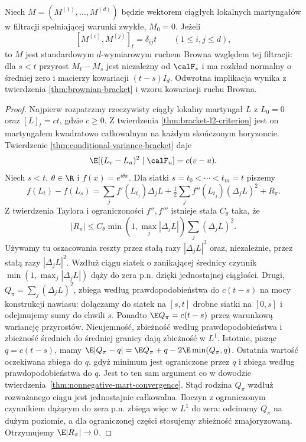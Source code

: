 \begin{twierdzenie}
\label{thm:levy-brownian-characterization}
Niech $M=(M^{(1)},\ldots,M^{(d)})$ będzie
wektorem ciągłych lokalnych martyngałów
w filtracji spełniającej warunki zwykłe,
$M_0=0$. Jeżeli
\[
[M^{(i)},M^{(j)}]_t=\delta_{ij}t
\qquad (1\le i,j\le d),
\]
to $M$ jest standardowym $d$-wymiarowym ruchem
Browna względem tej filtracji: dla $s<t$
przyrost $M_t-M_s$ jest niezależny od $\calF_s$
i ma rozkład normalny o średniej zero
i macierzy kowariacji $(t-s)I_d$.
Odwrotna implikacja wynika z twierdzenia
\ref{thm:brownian-bracket} i wzoru kowariacji
ruchu Browna.
\end{twierdzenie}
\begin{proof}
Najpierw rozpatrzmy rzeczywisty ciągły lokalny
martyngał $L$ z $L_0=0$ oraz $[L]_t=ct$,
gdzie $c\ge0$. Z twierdzenia
\ref{thm:bracket-l2-criterion} jest on martyngałem
kwadratowo całkowalnym na każdym skończonym
horyzoncie. Twierdzenie
\ref{thm:conditional-variance-bracket} daje
\[
\E[(L_v-L_u)^2\mid\calF_u]=c(v-u).
\]
Niech $s<t$, $\theta\in\R$ i
$f(x)=e^{i\theta x}$. Dla siatki
$s=t_0<\cdots<t_m=t$ piszemy
\[
f(L_t)-f(L_s)=
\sum_j f'(L_{t_j})\Delta_j L
+\tfrac12\sum_j f''(L_{t_j})(\Delta_j L)^2
+R_\pi .
\]
Z twierdzenia Taylora i ograniczoności
$f'',f'''$ istnieje stała $C_\theta$ taka, że
\[
|R_\pi|\le C_\theta
\min(1,\max_j|\Delta_j L|)
\sum_j(\Delta_j L)^2.
\]
Używamy tu oszacowania reszty przez stałą
razy $|\Delta_j L|^3$ oraz, niezależnie,
przez stałą razy $|\Delta_j L|^2$.
Wzdłuż ciągu siatek o zanikającej średnicy
czynnik $\min(1,\max_j|\Delta_jL|)$ dąży
do zera p.n. dzięki jednostajnej ciągłości.
Drugi, $Q_\pi=\sum_j(\Delta_j L)^2$,
zbiega według prawdopodobieństwa do $c(t-s)$
na mocy konstrukcji nawiasu: dołączamy do siatek
na $[s,t]$ drobne siatki na $[0,s]$
i odejmujemy sumy do chwili $s$.
Ponadto $\E Q_\pi=c(t-s)$ przez warunkową
wariancję przyrostów. Nieujemność, zbieżność
według prawdopodobieństwa i zbieżność średnich
do średniej granicy dają zbieżność w $L^1$.
Istotnie, pisząc $q=c(t-s)$, mamy
$\E|Q_\pi-q|=\E Q_\pi+q-2\E\min(Q_\pi,q)$.
Ostatnia wartość oczekiwana zbiega do $q$,
gdyż minimum jest ograniczone przez $q$
i zbiega według prawdopodobieństwa do $q$.
Jest to ten sam argument co w dowodzie
twierdzenia~\ref{thm:nonnegative-mart-convergence}.
Stąd rodzina $Q_\pi$ wzdłuż rozważanego ciągu
jest jednostajnie całkowalna.
Iloczyn z ograniczonym czynnikiem dążącym
do zera p.n. zbiega więc w $L^1$ do zera:
odcinamy $Q_\pi$ na dużym poziomie,
a dla ograniczonej części stosujemy zbieżność
zmajoryzowaną. Otrzymujemy $\E|R_\pi|\to0$.


\end{proof}
